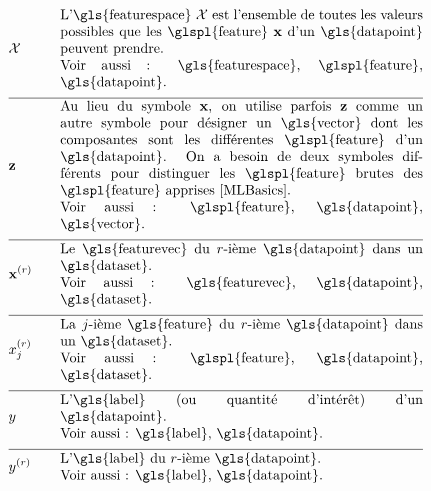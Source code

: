 \begin{align}	
	& \featurespace & \quad & \parbox{.75\textwidth}{L'\gls{featurespace} $\featurespace$ est l’ensemble de toutes les valeurs possibles que les \glspl{feature} $\featurevec$ d’un \gls{datapoint} peuvent prendre. \\ Voir aussi : \gls{featurespace}, \glspl{feature}, \gls{datapoint}.} \nonumber \\[2mm] \hline \nonumber\\[-5mm]
	& \rawfeaturevec & \quad & \parbox{.75\textwidth}{Au lieu du symbole $\featurevec$, on utilise parfois $\rawfeaturevec$ comme un autre symbole pour désigner un \gls{vector} dont les composantes sont les différentes \glspl{feature} d’un \gls{datapoint}. On a besoin de deux symboles différents pour distinguer les \glspl{feature} brutes des \glspl{feature} apprises \cite[Ch. 9]{MLBasics}. \\ Voir aussi : \glspl{feature}, \gls{datapoint}, \gls{vector}.} \nonumber \\[2mm] \hline \nonumber\\[-5mm]
	& \featurevec^{(\sampleidx)} & \quad & \parbox{.75\textwidth}{Le \gls{featurevec} du $\sampleidx$-ième \gls{datapoint} dans un \gls{dataset}. \\ Voir aussi : \gls{featurevec}, \gls{datapoint}, \gls{dataset}.} \nonumber \\[2mm] \hline \nonumber\\[-5mm]
	& \feature_{\featureidx}^{(\sampleidx)} & \quad & \parbox{.75\textwidth}{La $\featureidx$-ième \gls{feature} du $\sampleidx$-ième \gls{datapoint} dans un \gls{dataset}. \\ Voir aussi : \glspl{feature}, \gls{datapoint}, \gls{dataset}.} \nonumber  \\[2mm] \hline \nonumber\\[-5mm]
	& \truelabel & \quad & \parbox{.75\textwidth}{L'\gls{label} (ou quantité d’intérêt) d’un \gls{datapoint}. \\ Voir aussi : \gls{label}, \gls{datapoint}.} \nonumber \\[2mm] \hline \nonumber\\[-5mm]
	& \truelabel^{(\sampleidx)} & \quad & \parbox{.75\textwidth}{L'\gls{label} du $\sampleidx$-ième \gls{datapoint}. \\ Voir aussi : \gls{label}, \gls{datapoint}.} \nonumber
\end{align}

